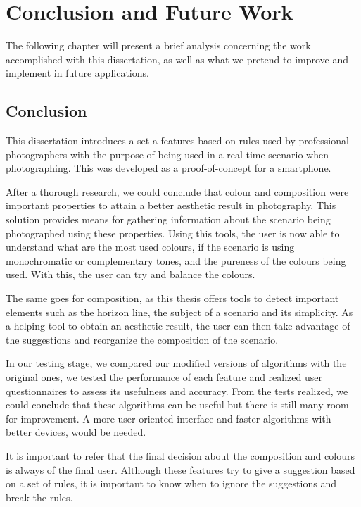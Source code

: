 \chapter{Conclusion and Future Work}
\label{cha:conclusion_future}

The following chapter will present a brief analysis concerning the work accomplished with this dissertation, as well as what we pretend to improve and implement in future applications.

\section{Conclusion}
\label{sec:conclusion}

This dissertation introduces a set a features based on rules used by professional photographers  with the purpose of being used in a real-time scenario when photographing. This was developed as a proof-of-concept for a smartphone.

After a thorough research, we could conclude that colour and composition were important properties to attain a better aesthetic result in photography. This solution provides means for gathering information about the scenario being photographed using these properties. Using this tools, the user is now able to understand what are the most used colours, if the scenario is using monochromatic or complementary tones, and the pureness of the colours being used. With this, the user can try and balance the colours.

The same goes for composition, as this thesis offers tools to detect important elements such as the horizon line, the subject of a scenario and its simplicity. As a helping tool to obtain an aesthetic result, the user can then take advantage of the suggestions and reorganize the composition of the scenario. 

In our testing stage, we compared our modified versions of algorithms with the original ones, we tested the performance of each feature and realized user questionnaires to assess its usefulness and accuracy. From the tests realized, we could conclude that these algorithms can be useful but there is still many room for improvement. A more user oriented interface and faster algorithms with better devices, would be needed.

It is important to refer that the final decision about the composition and colours is always of the final user. Although these features try to give a suggestion based on a set of rules, it is important to know when to ignore the suggestions and break the rules.

